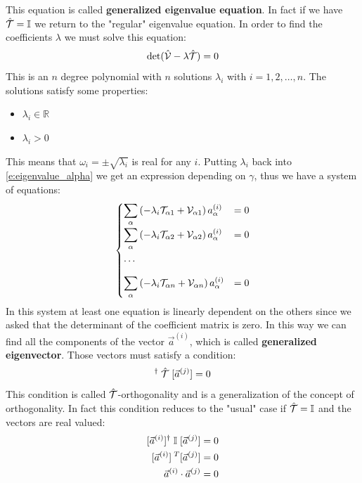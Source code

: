 This equation is called \textbf{generalized eigenvalue equation}. In fact if we have $\hat{\mathcal{T}} = \mathbb{I}$ we return to the "regular" eigenvalue equation. In order to find the coefficients $\lambda$ we must solve this equation:
\begin{equation}
    \det(\hat{\mathcal{V}}-\lambda\hat{\mathcal{T}}) = 0
\end{equation}
This is an $n$ degree polynomial with $n$ solutions $\lambda_i$ with $i=1,2,\dots,n$. The solutions satisfy some properties:
\begin{itemize}
    \item $\lambda_i \in \mathbb{R}$
    \item $\lambda_i > 0$
\end{itemize}
This means that $\omega_i = \pm \sqrt{\lambda_i}$ is real for any $i$. Putting $\lambda_i$ back into \eqref{e:eigenvalue_alpha} we get an expression depending on $\gamma$, thus we have a system of equations:
\begin{equation}
    \begin{cases}
        \displaystyle\sum_{\alpha}\left(-\lambda_i\mathcal{T}_{\alpha 1} + \mathcal{V}_{\alpha 1}\right)a_{\alpha}^{(i)} &= 0\\[10pt]
        \displaystyle\sum_{\alpha}\left(-\lambda_i\mathcal{T}_{\alpha 2} + \mathcal{V}_{\alpha 2}\right)a_{\alpha}^{(i)} &= 0\\[10pt]
        \dots\\[10pt]
        \displaystyle\sum_{\alpha}\left(-\lambda_i\mathcal{T}_{\alpha n} + \mathcal{V}_{\alpha n}\right)a_{\alpha}^{(i)} &= 0
    \end{cases}
\end{equation}
In this system at least one equation is linearly dependent on the others since we asked that the determinant of the coefficient matrix is zero. In this way we can find all the components of the vector $\vec{a}^{(i)}$, which is called \textbf{generalized eigenvector}.
Those vectors must satisfy a condition:
\begin{equation}
    [\vec{a}^{(i)}]^{\dagger}\;\hat{\Telegant}\;[\vec{a}^{(j)}] = 0
\end{equation}
This condition is called $\hat{\mathcal{T}}$-orthogonality and is a generalization of the concept of orthogonality. In fact this condition reduces to the "usual" case if $\hat{\mathcal{T}} = \mathbb{I}$ and the vectors are real valued:
\begin{equation}
    \begin{split}
        [\vec{a}^{(i)}]^{\dagger}\;\mathbb{I}\;[\vec{a}^{(j)}] &= 0\\
        \transpose{[\vec{a}^{(i)}]} [\vec{a}^{(j)}] &= 0 \\
        \vec{a}^{(i)}\cdot \vec{a}^{(j)} &= 0
    \end{split}
\end{equation}

